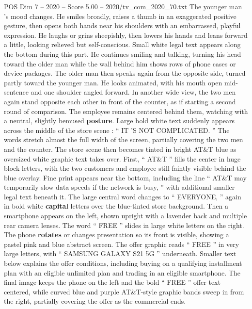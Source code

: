 \begin{textsample}{POS Dim 7 – 2020 – Score 5.00 – 2020/tv\_com\_2020\_70.txt}
The younger man ’s mood changes.
He smiles broadly, raises a thumb in an exaggerated positive gesture, then opens both hands near his shoulders with an embarrassed, playful expression.
He laughs or grins sheepishly, then lowers his hands and leans forward a little, looking relieved but self-conscious.
Small white legal text appears along the bottom during this part.
He continues smiling and talking, turning his head toward the older man while the wall behind him shows rows of phone cases or device packages.
The older man then speaks again from the opposite side, turned partly toward the younger man.
He looks animated, with his mouth open mid-sentence and one shoulder angled forward.
In another wide view, the two men again stand opposite each other in front of the counter, as if starting a second round of comparison.
The employee remains centered behind them, watching with a neutral, slightly bemused \textbf{posture}.
Large bold white text suddenly appears across the middle of the store scene : “ IT ’S NOT COMPLICATED. ” The words stretch almost the full width of the screen, partially covering the two men and the counter.
The store scene then becomes tinted in bright AT\&T blue as oversized white graphic text takes over.
First, “ AT\&T ” fills the center in huge block letters, with the two customers and employee still faintly visible behind the blue overlay.
Fine print appears near the bottom, including the line “ AT\&T may temporarily slow data speeds if the network is busy, ” with additional smaller legal text beneath it.
The large central word changes to “ EVERYONE, ” again in bold white \textbf{capital} letters over the blue-tinted store background.
Then a smartphone appears on the left, shown upright with a lavender back and multiple rear camera lenses.
The word “ FREE ” slides in large white letters on the right.
The phone \textbf{rotates} or changes presentation so its front is visible, showing a pastel pink and blue abstract screen.
The offer graphic reads “ FREE ” in very large letters, with “ SAMSUNG GALAXY S21 5G ” underneath.
Smaller text below explains the offer conditions, including buying on a qualifying installment plan with an eligible unlimited plan and trading in an eligible smartphone.
The final image keeps the phone on the left and the bold “ FREE ” offer text centered, while curved blue and purple AT\&T-style graphic bands sweep in from the right, partially covering the offer as the commercial ends.

\end{textsample}
